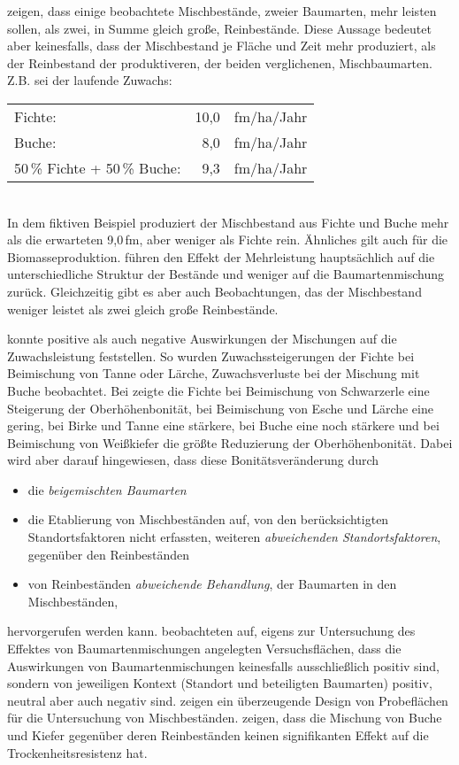 \documentclass[twocolumn]{scrartcl}
\begin{document}
\cite{pretzsch2017mischwald} zeigen, dass einige beobachtete
Mischbestände, zweier Baumarten, mehr leisten sollen, als zwei, in
Summe gleich große, Reinbestände. Diese Aussage bedeutet aber
keinesfalls, dass der Mischbestand je Fläche und Zeit mehr produziert,
als der Reinbestand der produktiveren, der beiden verglichenen,
Mischbaumarten.\\
Z.B. sei der laufende Zuwachs:\\
\begin{tabular}{lr@{\,}l}
    Fichte:                      & 10,0 & fm/ha/Jahr\\
    Buche:                       &  8,0 & fm/ha/Jahr\\
    50\,\% Fichte + 50\,\% Buche: &  9,3 & fm/ha/Jahr\\
\end{tabular}\\
In dem fiktiven Beispiel produziert der Mischbestand aus Fichte und
Buche mehr als die erwarteten 9,0\,fm, aber weniger als Fichte
rein. Ähnliches gilt auch für die Biomasseproduktion.
\cite{sterba2018struktur} führen den Effekt der Mehrleistung
hauptsächlich auf die unterschiedliche Struktur der Bestände und
weniger auf die Baumartenmischung zurück. Gleichzeitig gibt es aber
auch Beobachtungen, das der Mischbestand weniger leistet als zwei
gleich große Reinbestände.
 
\cite{vospernik2021grundflaechenzuwachs} konnte positive als auch
negative Auswirkungen der Mischungen auf die Zuwachsleistung
feststellen. So wurden Zuwachssteigerungen der Fichte bei Beimischung
von Tanne oder Lärche, Zuwachsverluste bei der Mischung mit Buche
beobachtet. Bei \cite{kindermann2018siteIndex} zeigte die Fichte bei
Beimischung von Schwarzerle eine Steigerung der Oberhöhenbonität, bei
Beimischung von Esche und Lärche eine gering, bei Birke und Tanne eine
stärkere, bei Buche eine noch stärkere und bei Beimischung von
Weißkiefer die größte Reduzierung der Oberhöhenbonität. Dabei wird
aber darauf hingewiesen, dass diese Bonitätsveränderung durch
\begin{itemize}
\item die \emph{beigemischten Baumarten}
\item die Etablierung von Mischbeständen auf, von den berücksichtigten
  Standortsfaktoren nicht erfassten, weiteren \emph{abweichenden
    Standortsfaktoren}, gegenüber den Reinbeständen
\item von Reinbeständen \emph{abweichende Behandlung}, der Baumarten
  in den Mischbeständen,
\end{itemize}
hervorgerufen werden kann. \cite{vanclay2022competitioninMixedSpecies}
beobachteten auf, eigens zur Untersuchung des Effektes von
Baumartenmischungen angelegten Versuchsflächen, dass die Auswirkungen
von Baumartenmischungen keinesfalls ausschließlich positiv sind,
sondern von jeweiligen Kontext (Standort und beteiligten Baumarten)
positiv, neutral aber auch negativ
sind. \cite{vanclay2013mixedSpecies,vanclay2021ExperimentsMixedSpecies}
zeigen ein überzeugende Design von Probeflächen für die Untersuchung
von Mischbeständen. \cite{streel2022Mischbestand} zeigen, dass die
Mischung von Buche und Kiefer gegenüber deren Reinbeständen keinen
signifikanten Effekt auf die Trockenheitsresistenz hat.
\end{document}

